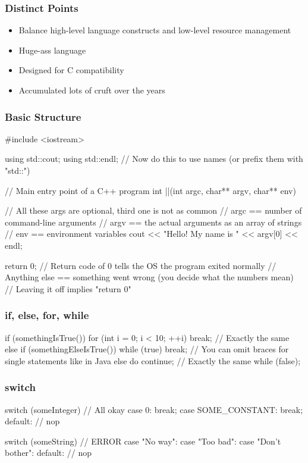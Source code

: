 \documentclass[glossy]{beamer}
\begin{document}
\begin{frame}
  \frametitle{Distinct Points}
  \begin{itemize}
    \item Balance high-level language constructs and low-level resource management
    \item Huge-ass language
    \item Designed for C compatibility
    \item Accumulated lots of cruft over the years
  \end{itemize}
\end{frame}

\begin{frame}[fragile=singleslide]
  \frametitle{Basic Structure}
  \begin{cppcode}
#include <iostream>

using std::cout;
using std::endl;
// Now do this to use names (or prefix them with "std::")

// Main entry point of a C++ program
int ||(int argc, char** argv, char** env) {
  // All these args are optional, third one is not as common
  // argc == number of command-line arguments 
  // argv == the actual arguments as an array of strings
  // env == environment variables
  cout << "Hello!  My name is " << argv[0] << endl;

  return 0;
  // Return code of 0 tells the OS the program exited normally
  // Anything else == something went wrong (you decide what the numbers mean)
  // Leaving it off implies "return 0"
}
  \end{cppcode}
\end{frame}

\begin{frame}[fragile=singleslide]
  \frametitle{if, else, for, while}
  \begin{cppcode}
if (somethingIsTrue()) {
  for (int i = 0; i < 10; ++i) {
    break; // Exactly the same
  }
}
else if (somethingElseIsTrue()) {
  while (true) break; // You can omit braces for single statements like in Java
}
else {
  do {
    continue; // Exactly the same
  } while (false);
}
  \end{cppcode}
\end{frame}

\begin{frame}[fragile=singleslide]
  \frametitle{switch}
  \begin{cppcode}
switch (someInteger) { // All okay
case 0:
  break;
case SOME_CONSTANT:
  break;
default:
  // nop
}

switch (someString) { // ERROR
case "No way":
case "Too bad":
case "Don't bother":
default:
  // nop
}
  \end{cppcode}
\end{frame}
\end{document}
